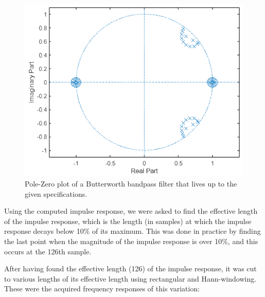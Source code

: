 \documentclass[journal]{IEEEtran}
\begin{document}
\begin{figure} [H]
    \centering
    \includegraphics[width=\linewidth]{assignment_02/plots/1.1_BW_PZPlot.png}
    \caption{Pole-Zero plot of a Butterworth bandpass filter that lives up to the given specifications.}
    \label{fig:butterbandpz}
\end{figure}

Using the computed impulse response, we were asked to find the effective length of the impulse response, which is the length (in samples) at which the impulse response decays below 10\% of its maximum. This was done in practice by finding the last point when the magnitude of the impulse response is over 10\%, and this occurs at the 126th sample. 

After having found the effective length (126) of the impulse response, it was cut to various lengths of its effective length using rectangular and Hann-windowing. These were the acquired frequency responses of this variation:
\end{document}
